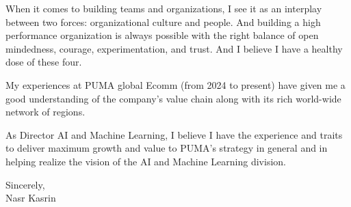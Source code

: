 When it comes to building teams and organizations, I see it as an interplay between two forces: organizational culture and people. And building a high performance organization is always possible with the right balance of open mindedness, courage, experimentation, and trust. And I believe I have a healthy dose of these four.

My experiences at PUMA global Ecomm (from 2024 to present) have given me a good understanding of the company’s value chain along with its rich world-wide network of regions. 

As Director AI and Machine Learning, I believe I have the experience and traits to deliver maximum growth and value to PUMA’s strategy in general and in helping realize the vision of the AI and Machine Learning division. 

\vspace{5ex}

Sincerely,\\
	
Nasr Kasrin

